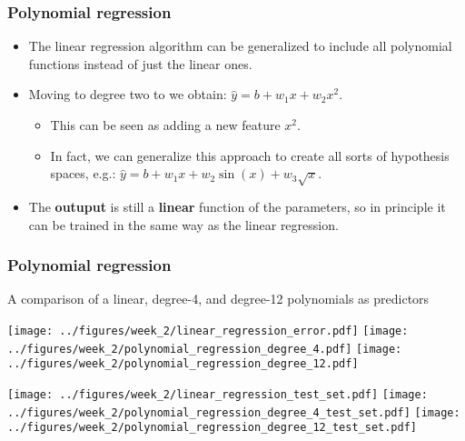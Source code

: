 \documentclass[notes]{beamer}          %
\newif\iffull
\begin{document}
\begin{frame}
\frametitle{Polynomial regression}
    \begin{itemize}
        \item The linear regression algorithm can be generalized to include all polynomial functions instead of just the linear ones.
        \iffull
        \item The linear regression model is then just a special case restricted to a polynomial of degree one: $\hat{y} = b + wx$.
        \fi
        \item Moving to degree two to we obtain: $\hat{y} = b + w_1 x + w_2 x^2$.
        \begin{itemize}
            \item This can be seen as adding a new feature $x^2$.
            \item In fact, we can generalize this approach to create all sorts of hypothesis spaces, e.g.: $\hat{y} = b + w_1 x + w_2 \sin{(x)} + w_3 \sqrt{x}$.
        \end{itemize}
        \item The {\bf outuput} is still a {\bf linear} function of the parameters, so in principle it can be trained in the same way as the linear regression.
    \end{itemize}
\end{frame}


\begin{frame}
\frametitle{Polynomial regression}
    A comparison of a linear, degree-4, and degree-12 polynomials as predictors
    \begin{center}
        \texttt{[image: ../figures/week\_2/linear\_regression\_error.pdf]}
        \texttt{[image: ../figures/week\_2/polynomial\_regression\_degree\_4.pdf]}
        \texttt{[image: ../figures/week\_2/polynomial\_regression\_degree\_12.pdf]}
    \end{center}
    \pause
    \begin{center}
        \texttt{[image: ../figures/week\_2/linear\_regression\_test\_set.pdf]}
        \texttt{[image: ../figures/week\_2/polynomial\_regression\_degree\_4\_test\_set.pdf]}
        \texttt{[image: ../figures/week\_2/polynomial\_regression\_degree\_12\_test\_set.pdf]}
    \end{center}
\end{frame}
\end{document}
